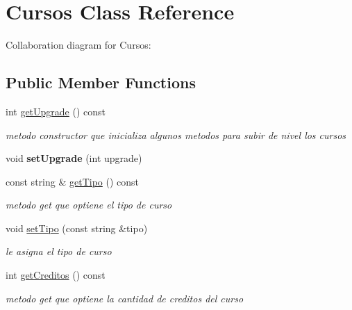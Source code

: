 \hypertarget{classCursos}{}\section{Cursos Class Reference}
\label{classCursos}


Collaboration diagram for Cursos\+:
\subsection*{Public Member Functions}
\begin{DoxyCompactItemize}
\item 
\mbox{\label{classCursos_a644d0d08a602088fec653a9090984425}} 
int \hyperlink{classCursos_a644d0d08a602088fec653a9090984425}{get\+Upgrade} () const
\begin{DoxyCompactList}\small\item\em metodo constructor que inicializa algunos metodos para subir de nivel los cursos \end{DoxyCompactList}\item 
\mbox{\label{classCursos_a53577aeeaace0477f4451ba01f5fa0c5}} 
void {\bfseries set\+Upgrade} (int upgrade)
\item 
const string \& \hyperlink{classCursos_a3a9c6c23bc0889f0a02451d3828334f8}{get\+Tipo} () const
\begin{DoxyCompactList}\small\item\em metodo get que optiene el tipo de curso \end{DoxyCompactList}\item 
void \hyperlink{classCursos_a96d5a28aef5969efb3f1f93bee013959}{set\+Tipo} (const string \&tipo)
\begin{DoxyCompactList}\small\item\em le asigna el tipo de curso \end{DoxyCompactList}\item 
\mbox{\label{classCursos_a05e0c7633d9da288ab2d0e6162e5876e}} 
int \hyperlink{classCursos_a05e0c7633d9da288ab2d0e6162e5876e}{get\+Creditos} () const
\begin{DoxyCompactList}\small\item\em metodo get que optiene la cantidad de creditos del curso \end{DoxyCompactList}\item 
\mbox{\label{classCursos_a2956a50ad53e77dc4fcb8c3190d8d071}} 

\end{DoxyCompactItemize}

